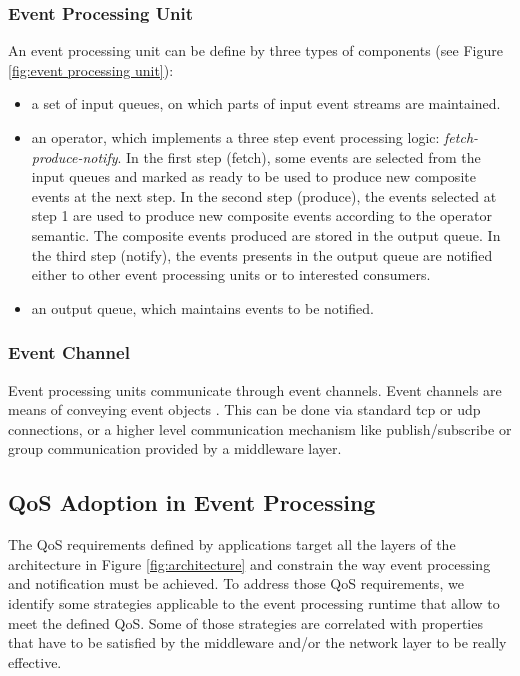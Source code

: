\documentclass[a4paper,twoside]{article}
\begin{document}
\subsubsection{Event Processing Unit}
An event processing unit can be define by three types of components (see Figure \ref{fig:event processing unit}):
\begin{itemize}
\item a set of input queues, on which parts of input event streams are maintained. 
\item an operator, which implements a three step event processing logic: \textit{fetch-produce-notify}. In the first step (fetch), some events are selected from the input queues and marked as ready to be used to produce new composite events at the next step. In the second step (produce), the events selected at step 1 are used to produce new composite events according to the operator semantic. The composite events produced are stored in the output queue. In the third step (notify), the events presents in the output queue are notified either to other event processing units or to interested consumers.  
\item an output queue, which maintains events to be notified.
\end{itemize}

\subsubsection{Event Channel}
Event processing units communicate through event channels. Event channels are means of conveying event objects \cite{Luckham2011}. This can be done via standard tcp or udp connections, or a higher level communication mechanism like publish/subscribe \cite{Eugster2003} or group communication  \cite{Chockler2001} provided by a middleware layer.

\subsection{QoS Adoption in Event Processing} 
The QoS requirements defined by applications target all the layers of the architecture in Figure \ref{fig:architecture} and constrain the way event processing and notification must be achieved. To address those
QoS requirements, we identify some strategies applicable to the event processing runtime that allow to meet the defined QoS. Some of those strategies are correlated with properties that have to be satisfied by the middleware and/or the network layer to be really effective.
\end{document}

